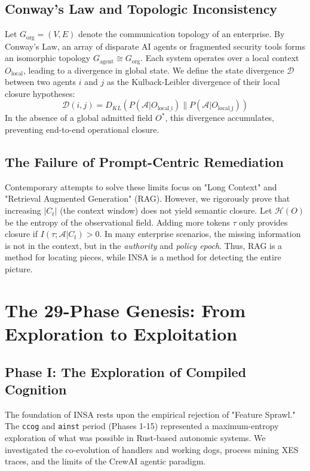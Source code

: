 \documentclass[12pt,a4paper,oneside]{book}
\begin{document}
\section{Conway's Law and Topologic Inconsistency}
Let $G_{\text{org}} = (V, E)$ denote the communication topology of an enterprise. By Conway's Law, an array of disparate AI agents or fragmented security tools forms an isomorphic topology $G_{\text{agent}} \cong G_{\text{org}}$. Each system operates over a local context $O_{\text{local}}$, leading to a divergence in global state. We define the state divergence $\mathcal{D}$ between two agents $i$ and $j$ as the Kulback-Leibler divergence of their local closure hypotheses:
\begin{equation}
\mathcal{D}(i, j) = D_{KL}( P(\mathcal{A} | O_{\text{local\_i}}) \| P(\mathcal{A} | O_{\text{local\_j}}) )
\end{equation}
In the absence of a global admitted field $O^*$, this divergence accumulates, preventing end-to-end operational closure.

\section{The Failure of Prompt-Centric Remediation}
Contemporary attempts to solve these limits focus on "Long Context" and "Retrieval Augmented Generation" (RAG). However, we rigorously prove that increasing $|C_t|$ (the context window) does not yield semantic closure. Let $\mathcal{H}(O)$ be the entropy of the observational field. Adding more tokens $\tau$ only provides closure if $I(\tau; \mathcal{A} | C_t) > 0$. In many enterprise scenarios, the missing information is not in the context, but in the \textit{authority} and \textit{policy epoch}. Thus, RAG is a method for locating pieces, while INSA is a method for detecting the entire picture.

\chapter{The 29-Phase Genesis: From Exploration to Exploitation}

\section{Phase I: The Exploration of Compiled Cognition}
The foundation of INSA rests upon the empirical rejection of "Feature Sprawl." The \texttt{ccog} and \texttt{ainst} period (Phases 1-15) represented a maximum-entropy exploration of what was possible in Rust-based autonomic systems. We investigated the co-evolution of handlers and working dogs, process mining XES traces, and the limits of the CrewAI agentic paradigm. 
\end{document}
